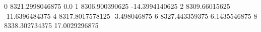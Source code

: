 0 8321.2998046875 0.0
1 8306.900390625 -14.3994140625
2 8309.66015625 -11.6396484375
4 8317.8017578125 -3.498046875
6 8327.443359375 6.1435546875
8 8338.302734375 17.0029296875
